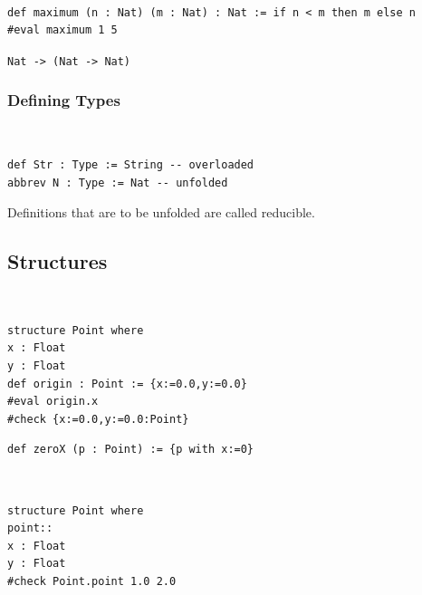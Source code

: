 \documentclass{article}
\begin{document}
\begin{example}~
    \begin{verbatim}
def maximum (n : Nat) (m : Nat) : Nat := if n < m then m else n
#eval maximum 1 5
\end{verbatim}
\end{example}

\begin{definition}[currying]
    \verb|Nat -> (Nat -> Nat)|
\end{definition}

\subsubsection{Defining Types}
\begin{definition}[Type]~
    \begin{verbatim}
def Str : Type := String -- overloaded
abbrev N : Type := Nat -- unfolded
\end{verbatim}
\end{definition}

\begin{definition}[overloaded]

\end{definition}

\begin{definition}[reducible]
    Definitions that are to be unfolded are called reducible.
\end{definition}

\subsection{Structures}
\begin{definition}[structure]~
    \begin{verbatim}
structure Point where
x : Float
y : Float
def origin : Point := {x:=0.0,y:=0.0}
#eval origin.x
#check {x:=0.0,y:=0.0:Point}
\end{verbatim}
\end{definition}

\begin{definition}
    \begin{verbatim}
def zeroX (p : Point) := {p with x:=0}
\end{verbatim}
\end{definition}

\begin{definition}[constructor]~
    \begin{verbatim}
structure Point where
point::
x : Float
y : Float
#check Point.point 1.0 2.0
\end{verbatim}
\end{definition}
\end{document}
